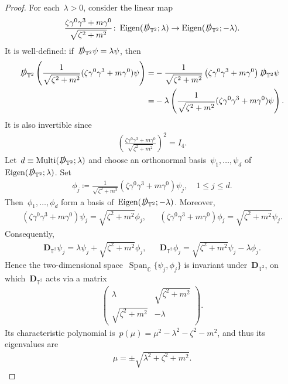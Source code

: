 \documentclass[10pt,a4paper]{amsart}
\newcommand{\C}{\mathbb{C}}
\newcommand{\T}{\mathbb{T}}
\newcommand{\D}{\slashed{D}}
\newcommand{\pD}{\mathbf{D}}
\newcommand{\parenthesis}[1]{\left(#1\right)} %
\DeclareMathOperator{\Eigen}{Eigen}
\DeclareMathOperator{\Mtp}{Multi} %
\DeclareMathOperator{\Span}{Span}
\begin{document}
\begin{proof}
    
    For each~$\lambda>0$, consider the linear map
    \begin{align}
        \frac{\zeta\gamma^0\gamma^3+m\gamma^0}{\sqrt{\zeta^2+m^2}}\colon \Eigen(\D_{\T^2};\lambda)\to \Eigen(\D_{\T^2};-\lambda).
    \end{align}
    It is well-defined: if~$\D_{\T^2}\psi=\lambda\psi$, then 
    \begin{align}
        \D_{\T^2}\parenthesis{\frac{1}{\sqrt{\zeta^2+m^2}}(\zeta\gamma^0\gamma^3+m\gamma^0)\psi}
        =&-\frac{1}{\sqrt{\zeta^2+m^2}}\parenthesis{\zeta\gamma^0\gamma^3+m\gamma^0}
        \D_{\T^2}\psi \\
        =&-\lambda \parenthesis{\frac{1}{\sqrt{\zeta^2+m^2}}(\zeta\gamma^0\gamma^3+m\gamma^0)\psi}. 
    \end{align}
    It is also invertible since 
    \begin{align}
        \parenthesis{ \frac{\zeta\gamma^0\gamma^3+m\gamma^0}{\sqrt{\zeta^2+m^2}} }^2=I_4.
    \end{align}
    Let~$d\equiv \Mtp(\D_{\T^2};\lambda)$ and choose an orthonormal basis~$\psi_1,\dots, \psi_d$ of~$\Eigen(\D_{\T^2};\lambda)$. 
    Set
    \begin{align}
        \phi_j \coloneqq \frac{1}{\sqrt{\zeta^2+m^2}} \parenthesis{\zeta\gamma^0\gamma^3+m\gamma^0}\psi_j,\quad 1\leq j\leq d. 
    \end{align}
    Then~$\phi_1,\dots,\phi_d$ form a basis of~$\Eigen(\D_{\T^2};-\lambda)$. 
    Moreover,
    \begin{align}
        \parenthesis{\zeta\gamma^0\gamma^3+m\gamma^0}\psi_j= \sqrt{\zeta^2+m^2}\phi_j, 
        & & 
        \parenthesis{\zeta\gamma^0\gamma^3+m\gamma^0}\phi_j = \sqrt{\zeta^2+m^2}\psi_j.
    \end{align}
    Consequently,
    \begin{align}
        \pD_{\T^2}\psi_j = \lambda \psi_j+\sqrt{\zeta^2+m^2}\phi_j,
        & & 
        \pD_{\T^2}\phi_j = \sqrt{\zeta^2+m^2}\psi_j-\lambda \phi_j.
    \end{align}
    Hence the two-dimensional space~$\Span_{\C}\{\psi_j,\phi_j\}$ is invariant under~$\pD_{\T^2}$,
    on which~$\pD_{\T^2}$ acts via a matrix
    \begin{align}
        \begin{pmatrix}
            \lambda & \sqrt{\zeta^2+m^2}\\
            \sqrt{\zeta^2+m^2} & -\lambda
        \end{pmatrix}.
    \end{align}
    Its characteristic polynomial is~$p(\mu)=\mu^2-\lambda^2-\zeta^2-m^2$, and thus its eigenvalues are
    \begin{align}
        \mu=\pm\sqrt{\lambda^2+\zeta^2+m^2}.
    \end{align}


\end{proof}
\end{document}
